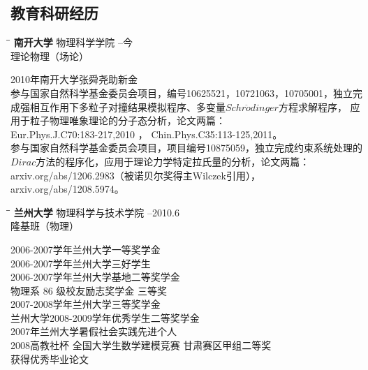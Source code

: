 \documentclass{res}
\begin{document}
\begin{CJK}{UTF8}{gbsn}
\begin{resume}
\section{教育科研经历}
   \vspace{-0.1in}	
   \begin{tabbing}
   \hspace{2.3in}\= \hspace{2.6in}\= \kill %
    {\bf 南开大学} \>物理科学学院     --今\\
                             \>理论物理（场论）
   \end{tabbing}\vspace{-20pt}      %
    2010年南开大学张舜尧助新金\\
    参与国家自然科学基金委员会项目，编号10625521，10721063，10705001，独立完成强相互作用下多粒子对撞结果模拟程序、多变量$Schr\ddot odinger$方程求解程序，
应用于粒子物理唯象理论的分子态分析，论文两篇：\\
    Eur.Phys.J.C70:183-217,2010 ， Chin.Phys.C35:113-125,2011。\\
    参与国家自然科学基金委员会项目，项目编号10875059，独立完成约束系统处理的$Dirac$方法的程序化，应用于理论力学特定拉氏量的分析，论文两篇：\\
    arxiv.org/abs/1206.2983（被诺贝尔奖得主Wilczek引用），arxiv.org/abs/1208.5974。
    \vspace{-0.1in}
   \begin{tabbing}
   \hspace{2.3in}\= \hspace{2.6in}\= \kill %
    {\bf 兰州大学} \>物理科学与技术学院 --2010.6\\
                          \>隆基班（物理）
   \end{tabbing}\vspace{-20pt}
    2006-2007学年兰州大学一等奖学金\\
    2006-2007学年兰州大学三好学生\\
    2006-2007学年兰州大学基地二等奖学金\\
    物理系 86 级校友励志奖学金 三等奖\\
    2007-2008学年兰州大学三等奖学金\\
    兰州大学2008-2009学年优秀学生二等奖学金\\
    2007年兰州大学暑假社会实践先进个人\\
    2008高教社杯 全国大学生数学建模竞赛 甘肃赛区甲组二等奖\\
    获得优秀毕业论文
      

\end{resume}
\end{CJK}
\end{document}
